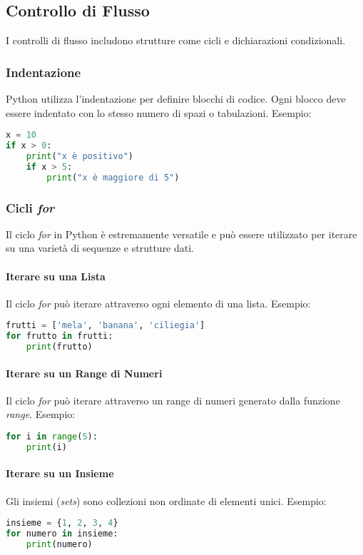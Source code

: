 \subsection{Controllo di Flusso}
I controlli di flusso includono strutture come cicli e dichiarazioni condizionali.

\subsubsection{Indentazione}
Python utilizza l'indentazione per definire blocchi di codice. Ogni blocco deve essere indentato con lo stesso numero di spazi o tabulazioni. Esempio:
\begin{lstlisting}[language=Python]
x = 10
if x > 0:
    print("x è positivo")
    if x > 5:
        print("x è maggiore di 5")
\end{lstlisting}

\subsubsection{Cicli \textit{for}}
Il ciclo \textit{for} in Python è estremamente versatile e può essere utilizzato per iterare su una varietà di sequenze e strutture dati.

\paragraph{Iterare su una Lista}
Il ciclo \textit{for} può iterare attraverso ogni elemento di una lista. Esempio:
\begin{lstlisting}[language=Python]
frutti = ['mela', 'banana', 'ciliegia']
for frutto in frutti:
    print(frutto)
\end{lstlisting}

\paragraph{Iterare su un Range di Numeri}
Il ciclo \textit{for} può iterare attraverso un range di numeri generato dalla funzione \textit{range}. Esempio:
\begin{lstlisting}[language=Python]
for i in range(5):
    print(i)
\end{lstlisting}

\paragraph{Iterare su un Insieme}
Gli insiemi (\textit{sets}) sono collezioni non ordinate di elementi unici. Esempio:
\begin{lstlisting}[language=Python]
insieme = {1, 2, 3, 4}
for numero in insieme:
    print(numero)
\end{lstlisting}


